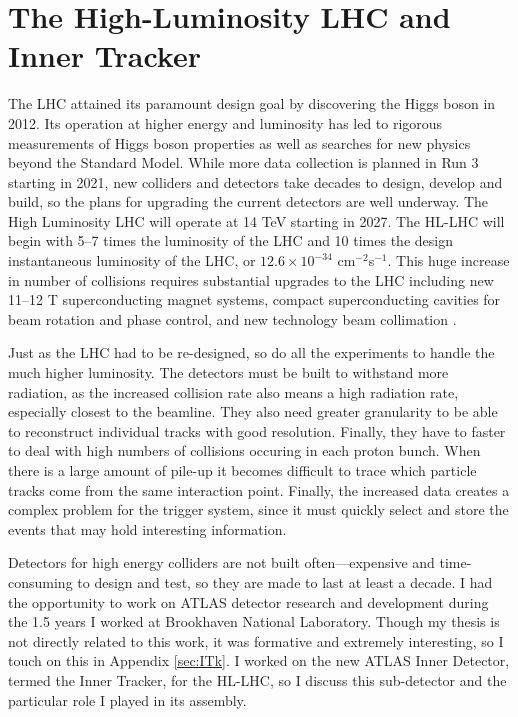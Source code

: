 \section{The High-Luminosity LHC and Inner Tracker}
The LHC attained its paramount design goal by discovering the Higgs boson in 2012. Its operation at higher energy and luminosity has led to rigorous measurements of Higgs boson properties as well as searches for new physics beyond the Standard Model. While more data collection is planned in Run 3 starting in 2021, new colliders and detectors take decades to design, develop and build, so the plans for upgrading the current detectors are well underway. The High Luminosity LHC will operate at 14 TeV starting in 2027. The HL-LHC will begin with 5--7 times the luminosity of the LHC and 10 times the design instantaneous luminosity of the LHC, or $12.6\times10^{-34}$ cm$^{-2}$s$^{-1}$. This huge increase in number of collisions requires substantial upgrades to the LHC including new 11--12 T superconducting magnet systems, compact superconducting cavities for beam rotation and phase control, and new technology beam collimation \cite{HLLHCYellow}. 

Just as the LHC had to be re-designed, so do all the experiments to handle the much higher luminosity. The detectors must be built to withstand more radiation, as the increased collision rate also means a high radiation rate, especially closest to the beamline. They also need greater granularity to be able to reconstruct individual tracks with good resolution. Finally, they have to faster to deal with high numbers of collisions occuring in each proton bunch. When there is a large amount of pile-up it becomes difficult to trace which particle tracks come from the same interaction point. Finally, the increased data creates a complex problem for the trigger system, since it must quickly select and store the events that may hold interesting information. 

Detectors for high energy colliders are not built often---expensive and time-consuming to design and test, so they are made to last at least a decade. I had the opportunity to work on ATLAS detector research and development during the 1.5 years I worked at Brookhaven National Laboratory. Though my thesis is not directly related to this work, it was formative and extremely interesting, so I touch on this in Appendix \ref{sec:ITk}. I worked on the new ATLAS Inner Detector, termed the Inner Tracker, for the HL-LHC, so I discuss this sub-detector and the particular role I played in its assembly.

